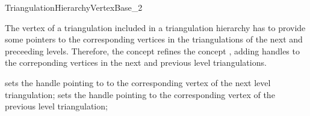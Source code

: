 

\begin{ccRefConcept}{TriangulationHierarchyVertexBase_2}


\ccDefinition 
The vertex of a triangulation  
included in a  triangulation hierarchy has to provide
some pointers to the corresponding vertices in the
triangulations of the next and preceeding levels.
Therefore, the concept 
refines the concept ,
adding handles to the correponding vertices in the
next and previous level triangulations.



\ccRefines
{}




\ccOperations
{}
\ccGlue
{}
\ccGlue
{}
{sets the handle pointing to  to the corresponding vertex
of the next level triangulation;} 
\ccGlue 
{}
{sets the handle pointing  to the corresponding vertex
of the previous level triangulation;}

\ccHasModels
{}

\ccSeeAlso
{} 

\ccExample




\end{ccRefConcept}


